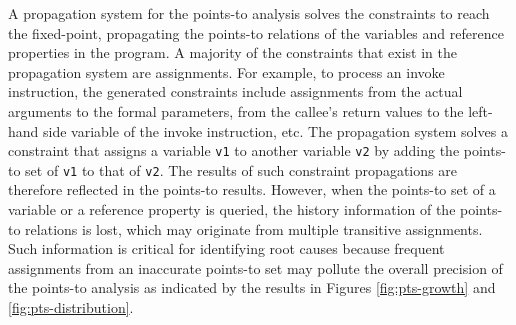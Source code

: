 A propagation system for the points-to analysis solves the constraints to reach the fixed-point, propagating the points-to relations of the variables and reference properties in the program. A majority of the constraints that exist in the propagation system are assignments. For example, to process an invoke instruction, the generated constraints include assignments from the actual arguments to the formal parameters, from the callee's return values to the left-hand side variable of the invoke instruction, etc. The propagation system solves a constraint that assigns a variable {\tt v1} to another variable {\tt v2} by adding the points-to set of {\tt v1} to that of {\tt v2}. The results of such constraint propagations are therefore reflected in the points-to results. However, when the points-to set of a variable or a reference property is queried, the history information of the points-to relations is lost, which may originate from multiple transitive assignments. Such information is critical for identifying root causes because frequent assignments from an inaccurate points-to set may pollute the overall precision of the points-to analysis as indicated by the results in Figures \ref{fig:pts-growth} and \ref{fig:pts-distribution}.

